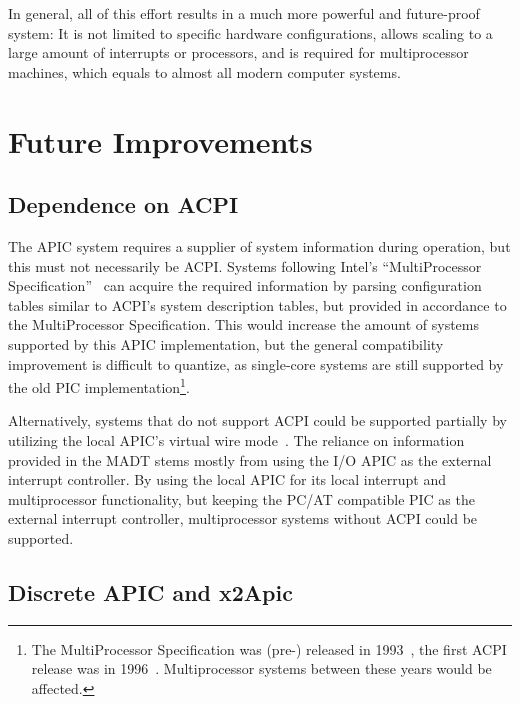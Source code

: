 In general, all of this effort results in a much more powerful and future-proof system: It is not
limited to specific hardware configurations, allows scaling to a large amount of interrupts or
processors, and is required for multiprocessor machines, which equals to almost all modern computer
systems.

\section{Future Improvements}
\label{sec:futureimprov}

\subsection{Dependence on ACPI}
\label{subsec:acpidependance}

The APIC system requires a supplier of system information during operation, but this must not
necessarily be ACPI. Systems following Intel's ``MultiProcessor Specification''~\cite{mpspec} can
acquire the required information by parsing configuration tables similar to ACPI's system
description tables, but provided in accordance to the MultiProcessor Specification. This would
increase the amount of systems supported by this APIC implementation, but the general compatibility
improvement is difficult to quantize, as single-core systems are still supported by the old PIC
implementation\footnote{The MultiProcessor Specification was (pre-) released in
  1993~\cite{mpspecpre}, the first ACPI release was in 1996~\cite{acpipre}. Multiprocessor systems
  between these years would be affected.}.

Alternatively, systems that do not support ACPI could be supported partially by utilizing the local
APIC's virtual wire mode~\cite[sec.~3.6.2.2]{mpspec}. The reliance on information provided in the
MADT stems mostly from using the I/O APIC as the external interrupt controller. By using the local
APIC for its local interrupt and multiprocessor functionality, but keeping the PC/AT compatible PIC
as the external interrupt controller, multiprocessor systems without ACPI could be supported.

\subsection{Discrete APIC and x2Apic}
\label{subsec:discretex2}


